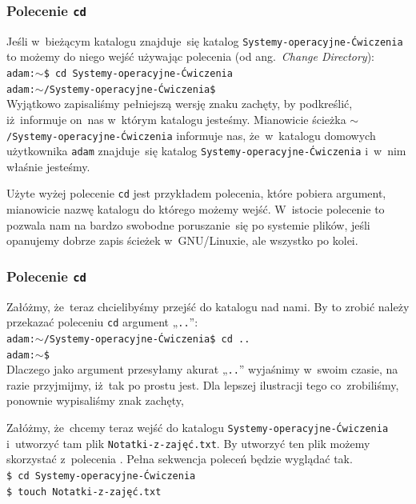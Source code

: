 \documentclass[10pt,t]{beamer}
\begin{document}
\begin{frame}
  \frametitle{Polecenie \texttt{cd}}


  Jeśli w~bieżącym katalogu znajduje~się katalog
  \texttt{Systemy-operacyjne-Ćwiczenia} to możemy do niego wejść
  używając polecenia
  (od ang.~\textit{Change Directory}): \\
  \texttt{adam:$\sim$\$ cd Systemy-operacyjne-Ćwiczenia} \\
  \texttt{adam:$\sim$/Systemy-operacyjne-Ćwiczenia\$} \\
  Wyjątkowo zapisaliśmy pełniejszą wersję znaku zachęty, by podkreślić,
  iż~informuje on~nas w~którym katalogu jesteśmy. Mianowicie ścieżka
  \texttt{$\sim$/Systemy-operacyjne-Ćwiczenia} informuje nas, że~w~katalogu
  domowych użytkownika \texttt{adam} znajduje~się katalog
  \texttt{Systemy-operacyjne-Ćwiczenia} i~w~nim właśnie jesteśmy.

  Użyte wyżej polecenie \texttt{cd} jest przykładem polecenia, które
  pobiera argument, mianowicie nazwę katalogu do którego możemy wejść.
  W~istocie polecenie to pozwala nam na bardzo swobodne poruszanie~się
  po systemie plików, jeśli opanujemy dobrze zapis ścieżek w~GNU/Linuxie,
  ale wszystko po kolei.

\end{frame}





\begin{frame}
  \frametitle{Polecenie \texttt{cd}}


  Załóżmy, że~teraz chcielibyśmy przejść do katalogu nad nami. By to zrobić
  należy przekazać poleceniu \texttt{cd} argument „\texttt{..}”: \\
  \texttt{adam:$\sim$/Systemy-operacyjne-Ćwiczenia\$ cd ..} \\
  \texttt{adam:$\sim$\$} \\
  Dlaczego jako argument przesyłamy akurat „\texttt{..}” wyjaśnimy w~swoim
  czasie, na razie przyjmijmy, iż~tak po prostu jest. Dla lepszej
  ilustracji tego co~zrobiliśmy, ponownie wypisaliśmy znak zachęty,

  Załóżmy, że~chcemy teraz wejść do katalogu
  \texttt{Systemy-operacyjne-Ćwiczenia} i~utworzyć tam plik
  \texttt{Notatki-z-zajęć.txt}. By utworzyć ten plik możemy skorzystać
  z~polecenia
  . Pełna
  sekwencja poleceń będzie wyglądać tak. \\
  \texttt{\$ cd Systemy-operacyjne-Ćwiczenia} \\
  \texttt{\$ touch Notatki-z-zajęć.txt} \\

\end{frame}
\end{document}
